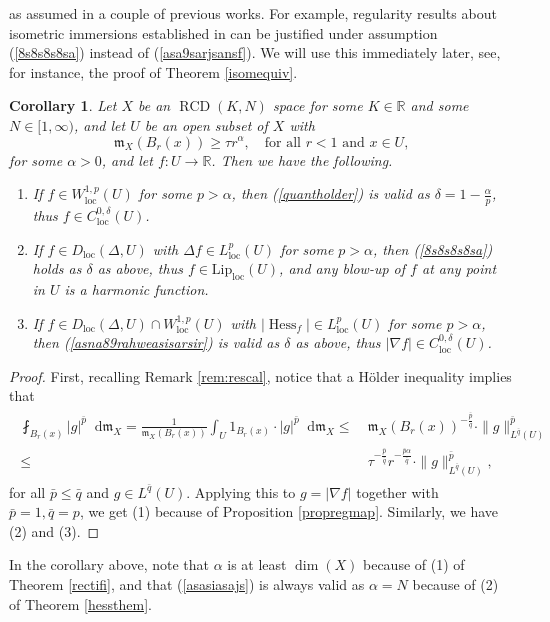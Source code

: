 \documentclass[11pt,reqno]{amsart}
\newtheorem{corollary}[theorem]{Corollary}
\theoremstyle{definition}
\numberwithin{equation}{section}
\newcommand{\di}{\mathop{}\!\mathrm{d}}
\newcommand{\meas}{\mathfrak{m}}
\DeclareMathOperator{\Hess}{Hess}
\DeclareMathOperator{\loc}{loc}
\DeclareMathOperator{\RCD}{RCD}
\begin{document}
        as assumed in a couple of previous works. For example, regularity results about isometric immersions established in \cite{Hisom} can be justified under assumption (\ref{8s8s8s8sa}) instead of (\ref{asa9sarjsansf}). We will use this immediately later, see, for instance, the proof of Theorem \ref{isomequiv}.
\begin{corollary}\label{prop:reglp}
Let $X$ be an $\RCD(K, N)$ space for some $K \in \mathbb{R}$ and some $N \in [1, \infty)$, and let $U$ be an open subset of $X$ with
\begin{equation}\label{asasiasajs}
    \meas_X(B_r(x)) \ge \tau r^{\alpha}, \quad \text{for all $r<1$ and $x \in U$,}
\end{equation}
for some $\alpha>0$, and let $f:U \to \mathbb{R}$.  Then we have the following.
\begin{enumerate}
\item If $f \in W^{1,p}_{\loc}(U)$ for some $p>\alpha$, then (\ref{quantholder}) is valid as $\delta=1-\frac{\alpha}{p}$, thus
$f\in C^{0,\delta}_{\loc}(U)$.
\item If $f \in D_{\loc}(\Delta, U)$ with $\Delta f \in L^p_{\loc}(U)$ for some $p>\alpha$, then (\ref{8s8s8s8sa}) holds as $\delta$ as above, thus $f\in \mathrm{Lip}_{\loc}(U)$, and any blow-up of $f$ at any point in $U$ is a harmonic function. 
\item If $f \in D_{\loc}(\Delta, U)\cap W^{1,p}_{\loc}(U)$ with $|\Hess_f| \in L^p_{\loc}(U)$ for some $p>\alpha$, then (\ref{asna89rahweasisarsir}) is valid as $\delta$ as above, thus $|\nabla f|\in C^{0,\delta}_{\loc}(U)$.
\end{enumerate}
\end{corollary}
\begin{proof}
    First, recalling Remark \ref{rem:rescal}, notice that a H\"older inequality implies that
    \begin{align}\begin{split}
         \fint_{B_r(x)}|g|^{\bar p}\di \meas_X =\frac{1}{\meas_X(B_r(x))}\int_U1_{B_r(x)}\cdot |g|^{\bar p}\di \meas_X  \le &\ \meas_X(B_r(x))^{-\frac{\bar p}{\bar q}}\cdot \|g\|_{L^{\bar q}(U)}^{\bar p} \\
         \le &\  \tau^{-\frac{\bar p}{\bar q}}r^{-\frac{\bar p\alpha }{\bar q}} \cdot \|g\|_{L^{\bar q}(U)}^{\bar p},\end{split}
    \end{align}
   for all $\bar p \le \bar q$ and $g \in L^{\bar q}(U)$. Applying this to $g=|\nabla f|$ together with $\bar p=1, \bar q=p$, we get (1) because of Proposition \ref{propregmap}. Similarly, we have (2) and (3).
\end{proof}
In the corollary above, note that $\alpha$ is at least $\dim(X)$ because of (1) of Theorem \ref{rectifi}, and that
     (\ref{asasiasajs}) is always valid as $\alpha=N$ because of (2) of Theorem \ref{hessthem}.
\end{document}

